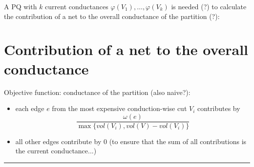 \documentclass[acmsmall,nonacm,screen,review]{acmart}
\begin{document}
\bigskip
A PQ with $k$ current conductances $\varphi(V_1), \dots, \varphi(V_k)$ is needed (?) to calculate the contribution of a net to the overall conductance of the partition (?):

\section{Contribution of a net to the overall conductance}
Objective function: conductance of the partition (also naive?):

\begin{itemize}
    \item each edge $e$ from the most expensive conduction-wise cut $V_i$ contributes by 
    \[\frac{\omega(e)}{\max\{vol(V_i), vol(V) - vol(V_i)\}}\]
    \item all other edges contribute by 0 (to ensure that the sum of all contributions is the current conductance...)
\end{itemize}
\hrule







\end{document}
